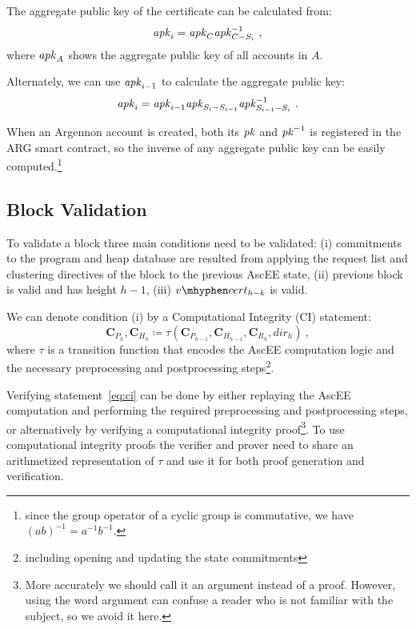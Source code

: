 The aggregate public key of the certificate can
be calculated from:
\begin{equation}
    \APK_i=\APK_C\APK_{C-S_i}^{-1}\label{eq:aggCertPK}\ ,
\end{equation}
where $\mathit{apk}_{A}$ shows the aggregate public key of all accounts in $A$.

Alternately, we can use $\mathit{apk}_{i-1}$ to calculate the aggregate public key:
\begin{equation}
    \APK_i=\APK_{i-1}\APK_{S_i-S_{i-1}}\APK_{S_{i-1}-S_i}^{-1}\ .\label{eq:aggPK-2}
\end{equation}

When an Argennon account is created, both its $\mathit{pk}$ and $\mathit{pk}^{-1}$ is registered in the ARG smart contract, so the
inverse of any aggregate public key can be easily computed.\footnote{since the group operator of a cyclic
group is commutative, we have $(ab)^{-1}=a^{-1}b^{-1}$.}

\subsection{Block Validation}\label{subsec:block-validation}

To validate a block three main conditions need to be validated: (i) commitments to the program and heap
database are resulted from applying the request list and clustering directives of the block to the previous AscEE
state, (ii) previous block is valid and has height $h - 1$, (iii) $v \mhyphen cert_{h-k}$ is valid.

We can denote condition (i) by a Computational Integrity (CI) statement:
\begin{equation}
    \label{eq:ci}
    \mathbf{C}_{P_h},\mathbf{C}_{H_h} \coloneqq \tau(\mathbf{C}_{P_{h-1}},\mathbf{C}_{H_{h-1}},\mathbf{C}_{R_{h}},
    dir_h)\ ,
\end{equation}
where $\tau$ is a transition function that encodes the AscEE computation logic and the necessary preprocessing and
postprocessing steps\footnote{including opening and updating the state commitments}.

Verifying statement~\ref{eq:ci} can be done by either replaying the AscEE computation and performing the required
preprocessing and postprocessing steps, or alternatively by
verifying a computational integrity proof\footnote{More accurately we should call it an argument instead of a proof.
However, using the word argument can confuse a reader who is not familiar with the subject, so we avoid it here.}.
To use computational integrity proofs the verifier and prover need to
share an arithmetized representation of $\tau$ and use it for both proof generation and verification.

